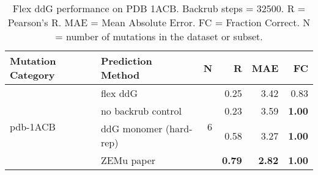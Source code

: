 \begin{table}
  \begin{tabular}{llrrrr}
\toprule
Mutation Category &       Prediction Method &  N &    R &  MAE &   FC \\
\midrule
 \multirow{ 4}{*}{pdb-1ACB} & flex ddG & \multirow{ 4}{*}{6} & 0.25 & 3.42 & 0.83  \\
 & no backrub control & & 0.23 & 3.59 & \textbf{1.00}  \\
 & ddG monomer (hard-rep) & & 0.58 & 3.27 & \textbf{1.00}  \\
 & ZEMu paper & & \textbf{0.79} & \textbf{2.82} & \textbf{1.00}  \\
\bottomrule
\end{tabular}
  \caption[Flex ddG performance on PDB 1ACB]{
    Flex ddG performance on PDB 1ACB. Backrub steps = 32500. R = Pearson's R. MAE = Mean Absolute Error. FC = Fraction Correct. N = number of mutations in the dataset or subset.
  } \label{tab:table-pdb-1ACB}
\end{table}
